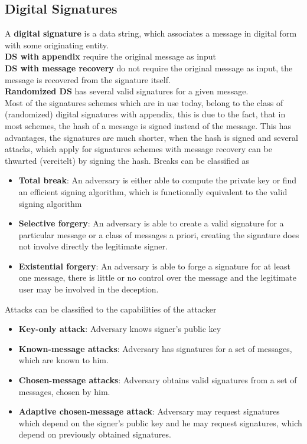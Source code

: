 \documentclass[a4paper, 10 pt, conference]{ieeeconf}
\begin{document}
\subsection{\textbf{Digital Signatures}}
A \textbf{digital signature} is a data string, which associates a message in digital form with some originating entity. \\
\textbf{DS with appendix} require the original message as input \\
\textbf{DS with message recovery} do not require the original message as input, the message is recovered from the signature itself.\\
\textbf{Randomized DS} has several valid signatures for a given message. \\
Most of the signatures schemes which are in use today, belong to the class of (randomized) digital signatures with appendix, this is due to the fact, that in most schemes, the hash of a message is signed instead of the message. 
This has advantages, the signatures are much shorter, when the hash is signed and several attacks, which apply for signatures schemes with message recovery can be thwarted (vereitelt) by signing the hash. Breaks can be classified as
\begin{itemize}
\item \textbf{Total break}: An adversary is either able to compute the private key or find an efficient signing algorithm, which is functionally equivalent to the valid signing algorithm
\item \textbf{Selective forgery}: An adversary is able to create a valid signature for a particular message or a class of messages a priori, creating the signature does not involve directly the legitimate signer.
\item \textbf{Existential forgery}: An adversary is able to forge a signature for at least one message, there is little or no control over the message and the legitimate user may be involved in the deception. 
\end{itemize}
Attacks can be classified to the capabilities of the attacker
\begin{itemize}
\item \textbf{Key-only attack}: Adversary knows signer's public key
\item \textbf{Known-message attacks}: Adversary has signatures for a set of messages, which are known to him.
\item \textbf{Chosen-message attacks}: Adversary obtains valid signatures from a set of messages, chosen by him. 
\item \textbf{Adaptive chosen-message attack}: Adversary may request signatures which depend on the signer's public key and he may request signatures, which depend on previously obtained signatures. 
\end{itemize}
\end{document}
